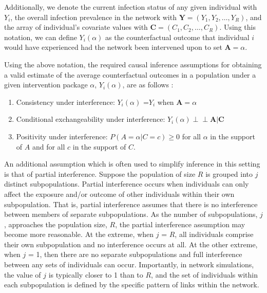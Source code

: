 \documentclass{article}
\theoremstyle{definition}
\newcommand{\indep}{\perp \!\!\! \perp}
\begin{document}
Additionally, we denote the current infection status of any given individual with $Y_i$, the overall infection prevalence in the network with $\mathbf{Y} = (Y_{1}, Y_{2}, \ldots, Y_{R})$, and the array of individual’s covariate values with  $\mathbf{C} = (C_{1}, C_{2}, \ldots, C_{R})$. Using this notation, we can define $Y_{i}(\alpha)$ as the counterfactual outcome that individual $i$ would have experienced had the network been intervened upon to set $\mathbf{A} = \alpha $.  

Using the above notation, the required causal inference assumptions for obtaining a valid estimate of the average counterfactual outcomes in a population under a given intervention package $\alpha$, $Y_{i}(\alpha)$, are as follows \cite{halloran_study_1991, hudgens_toward_2008, ogburn_causal_2014, tchetgen_tchetgen_causal_2012}:


\begin{enumerate}
\item Consistency under interference: $Y_{i}(\alpha)$ =$Y_{i}$ when $\mathbf{A} =\alpha$
\item 	Conditional exchangeability under interference: $Y_{i}(\alpha) \indep \mathbf{A} |\mathbf{C}$
\item Positivity under interference: $P(A = \alpha |C = c) \ge 0$ for all $\alpha$ in the support of $A$ and for all $c$ in the support of $C$.
\end{enumerate}

An additional assumption which is often used to simplify inference in this setting is that of partial interference. Suppose the population of size $R$ is grouped into $j$ distinct subpopulations. Partial interference occurs when individuals can only affect the exposure and/or outcome of other individuals within their own subpopulation. That is, partial interference assumes that there is no interference between members of separate subpopulations. As the number of subpopulations, $j$, approaches the population size, $R$, the partial interference assumption may become more reasonable. At the extreme, when $j$ = $R$, all individuals comprise their own subpopulation and no interference occurs at all. At the other extreme, when $j$ = 1, then there are no separate subpopulations and full interference between any sets of individuals can occur. Importantly, in network simulations, the value of $j$ is typically closer to 1 than to $R$, and the set of individuals within each subpopulation is defined by the specific pattern of links within the network.
\end{document}

